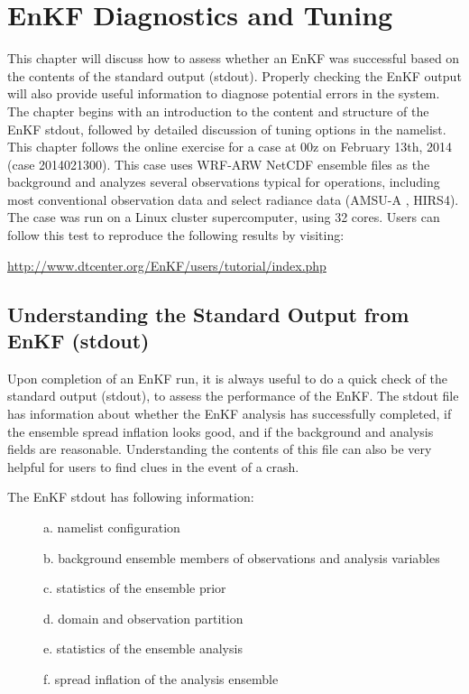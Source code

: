 \chapter{EnKF Diagnostics and Tuning}
\setlength{\parskip}{12pt}
This chapter will discuss how to assess whether an EnKF was successful based on the contents of the standard output (stdout). Properly checking the EnKF output will also provide useful information to diagnose potential errors in the system. The chapter begins with an introduction to the content and structure of the EnKF stdout, followed by detailed discussion of tuning options in the namelist.
This chapter follows the online exercise for a case at 00z on February 13th, 2014 (case 2014021300). This case uses WRF-ARW NetCDF ensemble files as the background and analyzes several observations typical for operations, including most conventional observation data and select radiance data (AMSU-A , HIRS4). The case was run on a Linux cluster supercomputer, using 32 cores. Users can follow this test to reproduce the following results by visiting:

\url{http://www.dtcenter.org/EnKF/users/tutorial/index.php}

\section{Understanding the Standard Output from EnKF (stdout)}

Upon completion of an EnKF run, it is always useful to do a quick check of the standard output (stdout), to assess the performance of the EnKF. The stdout file has information about whether the EnKF analysis has successfully completed, if the ensemble spread inflation looks good, and if the background and analysis fields are reasonable. Understanding the contents of this file can also be very helpful for users to find clues in the event of a crash.

The EnKF stdout has following information:
\begin{description}
\item[ ] a. namelist configuration
\item[ ] b. background ensemble members of observations and analysis variables
\item[ ] c. statistics of the ensemble prior
\item[ ] d. domain and observation partition
\item[ ] e. statistics of the ensemble analysis
\item[ ] f. spread inflation of the analysis ensemble
\end{description}

